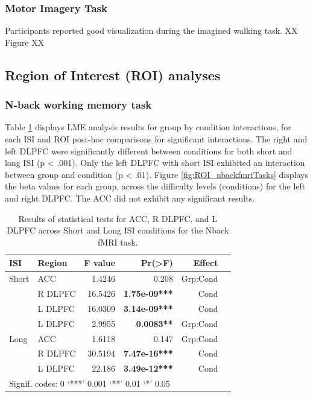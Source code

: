 \documentclass[a4paper,fleqn]{cas-sc}
\begin{document}
\subsubsection{Motor Imagery Task}
Participants reported good visualization during the imagined walking task. XX Figure XX 

\newpage

\subsection{Region of Interest (ROI) analyses}
\subsubsection{N-back working memory task}
Table \ref{tab:nback_roi_results} displays LME analysis results for group by condition interactions, for each ISI and ROI post-hoc comparisons for significant interactions. The right and left DLPFC were significantly different between conditions for both short and long ISI (p < .001). Only the left DLPFC with short ISI exhibited an interaction between group and condition (p < .01). Figure \ref{fig:ROI_nbackfmriTasks} displays the beta values for each group, across the difficulty levels (conditions) for the left and right DLPFC. The ACC did not exhibit any significant results.

\begin{table}[h!]
\centering
\caption{Results of statistical tests for ACC, R DLPFC, and L DLPFC across Short and Long ISI conditions for the Nback fMRI task.}
\label{tab:nback_roi_results}
\begin{tabular}{llrrrr}
\toprule
\textbf{ISI}   & \textbf{Region} & \textbf{F value} & \textbf{Pr(>F)} & \textbf{Effect} \\ 
\midrule
Short          & ACC            & 1.4246           & 0.208           & Grp:Cond        \\
               & R DLPFC        & 16.5426          & \textbf{1.75e-09***} & Cond        \\
               & L DLPFC        & 16.0309          & \textbf{3.14e-09***} & Cond        \\
               & L DLPFC        & 2.9955           & \textbf{0.0083**}  & Grp:Cond        \\
Long           & ACC            & 1.6118           & 0.147           & Grp:Cond        \\
               & R DLPFC        & 30.5194          & \textbf{7.47e-16***} & Cond        \\
               & L DLPFC        & 22.186           & \textbf{3.49e-12***} & Cond        \\
\bottomrule
\multicolumn{5}{l}{Signif. codes: 0 ‘***’ 0.001 ‘**’ 0.01 ‘*’ 0.05} 
\end{tabular}
\end{table}
\end{document}
